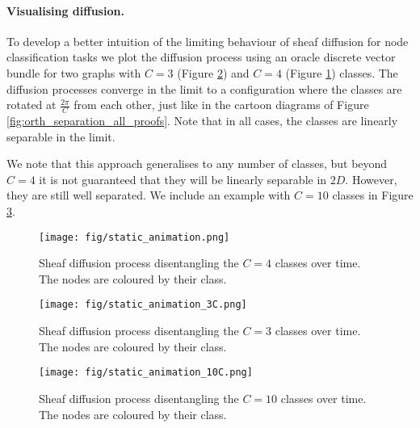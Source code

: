 \documentclass{article}
\begin{document}
\paragraph{Visualising diffusion.} To develop a better intuition of the limiting behaviour of sheaf diffusion for node classification tasks we plot the diffusion process using an oracle discrete vector bundle for two graphs with $C=3$ (Figure \ref{fig:sheaf_diffusion_3C}) and $C=4$ (Figure \ref{fig:sheaf_diffusion_4C}) classes. The diffusion processes converge in the limit to a configuration where the classes are rotated at $\frac{2\pi}{C}$ from each other, just like in the cartoon diagrams of Figure \ref{fig:orth_separation_all_proofs}. Note that in all cases, the classes are linearly separable in the limit. 

We note that this approach generalises to any number of classes, but beyond $C=4$ it is not guaranteed that they will be linearly separable in $2D$. However, they are still well separated. We include an example with $C=10$ classes in Figure \ref{fig:sheaf_diffusion_10C}.  

\begin{figure}[h]
    \centering
    \texttt{[image: fig/static\_animation.png]}
    \caption{Sheaf diffusion process disentangling the $C=4$ classes over time. The nodes are coloured by their class.}
    \label{fig:sheaf_diffusion_4C}
\end{figure}

\begin{figure}[h]
    \centering
    \texttt{[image: fig/static\_animation\_3C.png]}
    \caption{Sheaf diffusion process disentangling the $C=3$ classes over time. The nodes are coloured by their class.}
    \label{fig:sheaf_diffusion_3C}
\end{figure}

\begin{figure}[h]
    \centering
    \texttt{[image: fig/static\_animation\_10C.png]}
    \caption{Sheaf diffusion process disentangling the $C=10$ classes over time. The nodes are coloured by their class.}
    \label{fig:sheaf_diffusion_10C}
\end{figure}
\end{document}
